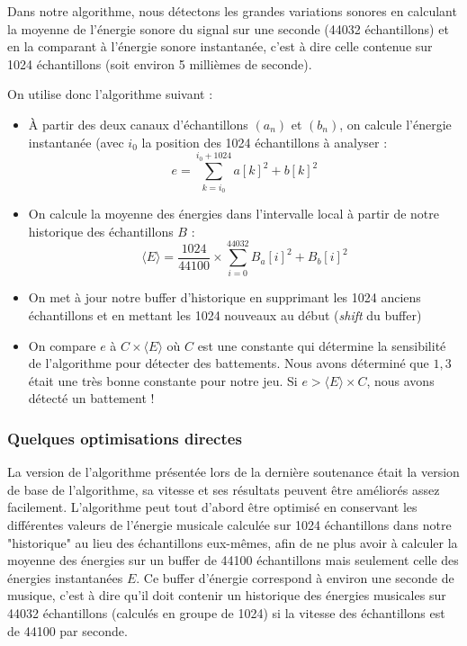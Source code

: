 \par Dans notre algorithme, nous détectons les grandes variations sonores en calculant la moyenne de l'énergie sonore du signal sur une seconde (44032 échantillons) et en la comparant à l'énergie sonore instantanée, c'est à dire celle contenue sur 1024 échantillons (soit environ 5 millièmes de seconde).
\par On utilise donc l'algorithme suivant :
\begin{itemize}
	\item À partir des deux canaux d'échantillons $(a_n)$ et $(b_n)$, on calcule l'énergie
	instantanée (avec $i_0$ la position des 1024 échantillons à analyser :
	$$e = \sum_{k=i_0}^{i_0 + 1024} a[k]^2 + b[k]^2$$
	
	\item On calcule la moyenne des énergies dans l'intervalle local à partir de notre
	historique des échantillons $B$ :
	$$\langle E \rangle = \frac{1024}{44100} \times \sum_{i=0}^{44032} B_a[i]^2 + B_b[i]^2$$
	
	\item On met à jour notre buffer d'historique en supprimant les 1024 anciens échantillons
	et en mettant les 1024 nouveaux au début (\emph{shift} du buffer)
	
	\item On compare $e$ à $C \times \langle E \rangle $ où $C$ est une constante qui détermine
	 la sensibilité de l'algorithme pour détecter des battements. Nous avons déterminé que
	 $1,3$ était une très bonne constante pour notre jeu. Si $e > \langle E \rangle \times C$,
	 nous avons détecté un battement !
\end{itemize}


\subsubsection{Quelques optimisations directes}

\par La version de l'algorithme présentée lors de la dernière soutenance était la version de base de l'algorithme,
sa vitesse et ses résultats peuvent être améliorés assez facilement. L'algorithme peut tout d'abord être optimisé en
conservant les différentes valeurs de l'énergie musicale calculée sur 1024 échantillons dans notre "historique"
au lieu des échantillons eux-mêmes, afin de ne plus avoir à calculer la moyenne des énergies sur un buffer de 44100 échantillons
mais seulement celle des énergies instantanées $E$. Ce buffer d'énergie correspond à environ une seconde de musique,
c'est à dire qu'il doit contenir un historique des énergies musicales sur 44032 échantillons (calculés en groupe de 1024)
si la vitesse des échantillons est de 44100 par seconde.

